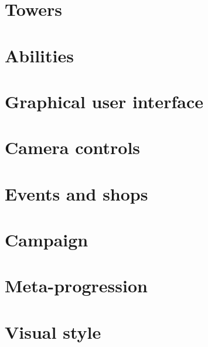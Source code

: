 \section{Towers}

\section{Abilities}

\section{Graphical user interface}

\section{Camera controls}

\section{Events and shops}

\section{Campaign}

\section{Meta-progression}

\section{Visual style}